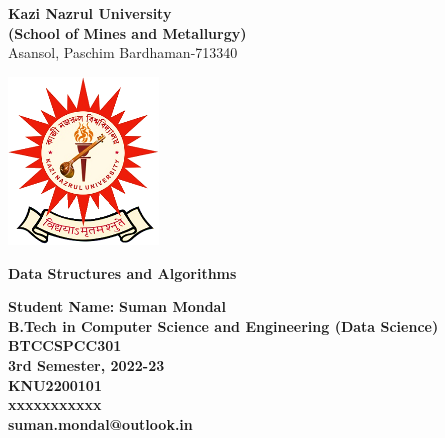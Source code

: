 
\begin{titlepage}
  \begin{center}
    \vspace*{3cm}
    {\huge \textbf{Kazi Nazrul University} }\\
    \vspace{0.2cm}
    {\LARGE \textbf{(School of Mines and Metallurgy)}} \\
    \vspace{0.2cm}
    {\Large {Asansol, Paschim Bardhaman-713340}} \\ 
    \vspace{1cm}
    
    \includegraphics[width=4cm]{../../assets/Kazi_Nazrul_University_Logo.png} \\
    \vspace{1.5cm}
    
    {\LARGE \textbf{Data Structures and Algorithms}} \\ 
    \vspace{1cm}
    
  \end{center}
    
    
  \noindent \large{\textbf {Student Name:}} \Large{\textbf{Suman Mondal}} \\
      
   \Large{\textbf{B.Tech in Computer Science and Engineering (Data Science)}} \\
  
   \Large{\textbf{BTCCSPCC301}} \\

   \Large{\textbf{3rd Semester, 2022-23}} \\
      
   \Large{\textbf{KNU2200101}} \\
      
   \Large{\textbf{xxxxxxxxxxx}} \\
      
   \Large{\textbf{suman.mondal@outlook.in}} \\
  \vspace{2cm}  
\end{titlepage}

  
  
  
  